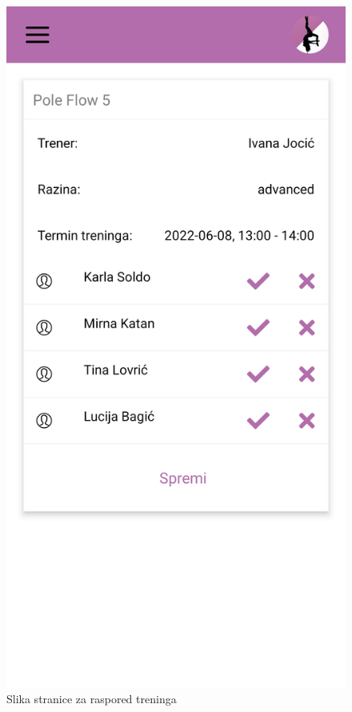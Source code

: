 \documentclass[times, utf8, zavrsni]{fer}
\begin{document}
			\begin{figure}[H]
        			\includegraphics[scale=0.2]{slike/App_dolaznost.jpg}
        			\centering
        			\caption{Slika stranice za raspored treninga}
        			\label{fig:promjene}
        		\end{figure}
			    
\end{document}
